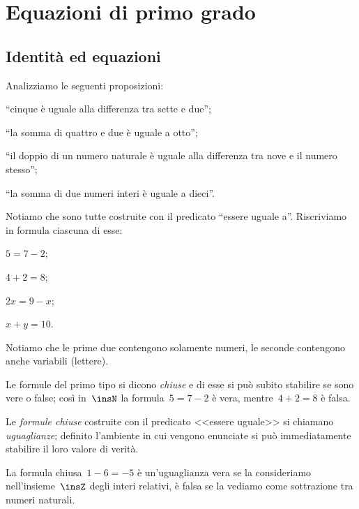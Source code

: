 \chapter{Equazioni di primo grado}\label{cap:equazioni_I_grado}
\section{Identità ed equazioni}

Analizziamo le seguenti proposizioni:

\begin{enumeratea}
\item ``cinque è uguale alla differenza tra sette e due'';
\item ``la somma di quattro e due è uguale a otto'';
\item ``il doppio di un numero naturale è uguale alla differenza tra nove e il numero stesso'';
\item ``la somma di due numeri interi è uguale a dieci''.
\end{enumeratea}

Notiamo che sono tutte costruite con il predicato
``essere uguale a''. Riscriviamo in formula ciascuna di esse:
\begin{multicols}{4}
 \begin{enumeratea}
\item $5=7-2$;
\item $4+2=8$;
\item $2x=9-x$;
\item $x+y=10$.
\end{enumeratea}
\end{multicols}
Notiamo che le prime due contengono solamente numeri, le seconde
contengono anche variabili (lettere).

Le formule del primo tipo si dicono \emph{chiuse} e
di esse si può subito stabilire se sono vere o false; così in~$\insN$ la
formula~$5 = 7 - 2$ è vera, mentre~$4 + 2 = 8$ è falsa.

\begin{definizione}
 Le \emph{formule chiuse} costruite con il predicato
<<essere uguale>> si chiamano \emph{uguaglianze};
definito l'ambiente in cui vengono enunciate si può
immediatamente stabilire il loro valore di verità.
\end{definizione}

\begin{exrig}
 \begin{esempio}
 La formula chiusa~$1 - 6 = -5$ è un'uguaglianza
vera se la consideriamo nell'insieme~$\insZ$ degli interi
relativi, è falsa se la vediamo come sottrazione tra numeri naturali.
 \end{esempio}
\end{exrig}

